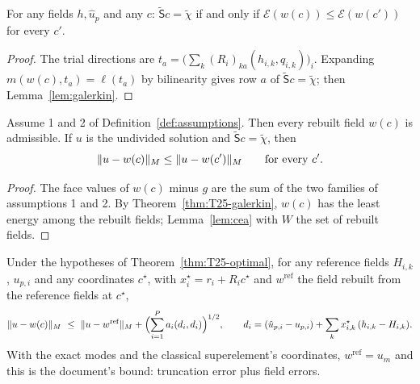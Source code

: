 \begin{theorem}\label{thm:T25-galerkin}
  \leanok
  For any fields $h,\hat u_p$ and any $c$:
  $\tilde{\mathsf S}c=\tilde\chi$ if and only if
  $\mathcal E(w(c))\le\mathcal E(w(c'))$ for every $c'$.
\end{theorem}

\begin{proof}
  \leanok
  The trial directions are
  $t_a=\bigl(\sum_k(R_i)_{ka}(h_{i,k},q_{i,k})\bigr)_i$.  Expanding
  $m(w(c),t_a)=\ell(t_a)$ by bilinearity gives row $a$ of
  $\tilde{\mathsf S}c=\tilde\chi$; then Lemma~\ref{lem:galerkin}.
\end{proof}

\begin{theorem}\label{thm:T25-optimal}
  \leanok
  Assume 1 and 2 of Definition~\ref{def:assumptions}.  Then every rebuilt
  field $w(c)$ is admissible.  If $u$ is the undivided solution and
  $\tilde{\mathsf S}c=\tilde\chi$, then
  \[
    \lVert u-w(c)\rVert_M\le\lVert u-w(c')\rVert_M\qquad\text{for every }c' .
  \]
\end{theorem}

\begin{proof}
  \leanok
  The face values of $w(c)$ minus $g$ are the sum of the two families of
  assumptions 1 and 2.  By Theorem~\ref{thm:T25-galerkin}, $w(c)$ has the least
  energy among the rebuilt fields; Lemma~\ref{lem:cea} with $W$ the set of
  rebuilt fields.
\end{proof}

\begin{theorem}\label{thm:T25-bound}
  \leanok
  Under the hypotheses of Theorem~\ref{thm:T25-optimal}, for any reference
  fields $H_{i,k}$, $u_{p,i}$ and any coordinates $c^\star$, with
  $x_i^\star=r_i+R_ic^\star$ and $w^{\mathrm{ref}}$ the field rebuilt from the
  reference fields at $c^\star$,
  \[
    \norm{u-w(c)}_M\ \le\ \norm{u-w^{\mathrm{ref}}}_M
      +\Bigl(\sum_{i=1}^Pa_i(d_i,d_i)\Bigr)^{1/2},
    \qquad d_i=(\hat u_{p,i}-u_{p,i})+\sum_kx^\star_{i,k}\,(h_{i,k}-H_{i,k}).
  \]
  With the exact modes and the classical superelement's coordinates,
  $w^{\mathrm{ref}}=u_m$ and this is the document's bound: truncation error
  plus field errors.
\end{theorem}

